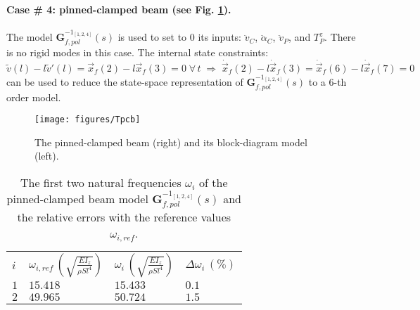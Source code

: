 \paragraph{Case \# 4: pinned-clamped beam (see Fig. \ref{fig:Tpc}).} The model $\mathbf{G}_{f,pol}^{-1_{[1,2,4]}}(s)$ is used to set to $0$ its inputs: $\ddot{v}_C$, $\ddot{\alpha}_C$, $\ddot{v}_P$, and $T^z_P$. There is no rigid modes in this case. The internal state constraints:
\[
\widetilde{v}(l)-l\widetilde{v}'(l)=\vec{x}_f(2)-l\vec{x}_f(3)=0\;\forall\,t\;\Rightarrow\;\dot{\vec{x}}_f(2)-l\dot{\vec{x}}_f(3)=\dot{\vec{x}}_f(6)-l\dot{\vec{x}}_f(7)=0
\]
can be used to reduce the state-space representation of $\mathbf{G}_{f,pol}^{-1_{[1,2,4]}}(s)$ to a $6$-th order model.
\begin{figure}[htbp!]
  \texttt{[image: figures/Tpcb]}
\caption{The pinned-clamped beam (right) and its block-diagram model (left).}
\label{fig:Tpc} 
\end{figure}
\begin{table}[htbp!]
\caption{The first two natural frequencies $\omega_i$ of the pinned-clamped beam model $\mathbf{G}_{f,pol}^{-1_{[1,2,4]}}(s)$ and the relative errors with the reference values $\omega_{i,ref}$.}
\label{tab:Tpc}       %
\begin{tabular}{llll}
\hline\noalign{\smallskip}
  $i$ & $\omega_{i,ref}\,\left(\sqrt{\frac{EI_z}{\rho S l^4}}\right)$ &  $\omega_i\,\left(\sqrt{\frac{EI_z}{\rho S l^4}}\right)$ &  $\Delta \omega_i\,(\%)$ \\
\noalign{\smallskip}\hline\noalign{\smallskip}
$1$ & $15.418$ & $15.433$  & $0.1$ \\ 
$2$ & $49.965$ & $50.724$ & $1.5$ \\
\hline
\end{tabular}
\end{table}

\FloatBarrier
